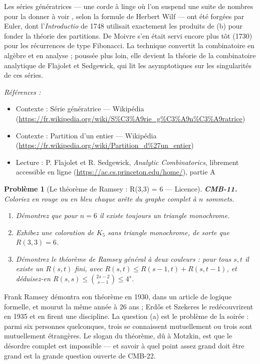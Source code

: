 \documentclass[11pt]{article}
\newtheorem{problem}{Problème}
\newenvironment{refs}{\par\small\noindent\emph{Références :}\begin{itemize}\setlength\itemsep{0pt}}{\end{itemize}\normalsize}
\begin{document}
\noindent Les séries génératrices --- \og{} une corde à linge où l'on suspend une suite de
nombres pour la donner à voir \fg{}, selon la formule de Herbert Wilf --- ont été forgées par Euler, dont
l'\textit{Introductio} de 1748 utilisait exactement les produits de (b) pour fonder la théorie des
partitions. De Moivre s'en était servi encore plus tôt (1730) pour les récurrences de type
Fibonacci. La technique convertit la combinatoire en algèbre et en analyse ; poussée plus loin,
elle devient la théorie de la combinatoire analytique de Flajolet et Sedgewick, qui lit les
asymptotiques sur les singularités de ces séries.

\begin{refs}
\item Contexte : Série génératrice --- Wikipédia (\url{https://fr.wikipedia.org/wiki/S%C3%A9rie_g%C3%A9n%C3%A9ratrice})
\item Contexte : Partition d'un entier --- Wikipédia (\url{https://fr.wikipedia.org/wiki/Partition_d%27un_entier})
\item Lecture : P. Flajolet et R. Sedgewick, \textit{Analytic Combinatorics}, librement accessible en ligne (\url{https://ac.cs.princeton.edu/home/}), partie A
\end{refs}

\bigskip

\begin{problem}[{Le théorème de Ramsey : R(3,3) = 6 --- Licence}]
\textbf{CMB-11.} Coloriez en rouge ou en bleu chaque arête du graphe complet à $ n $
sommets.
\begin{enumerate}
\item[(a)] Démontrez que pour $ n = 6 $ il existe toujours un triangle monochrome.
\item[(b)] Exhibez une coloration de $ K_5 $ sans triangle monochrome, de sorte que
$ R(3,3) = 6 $.
\item[(c)] Démontrez le théorème de Ramsey général à deux couleurs : pour tous $ s, t $ il existe un
$ R(s,t) $ fini, avec $ R(s,t) \le R(s-1,t) + R(s,t-1) $, et déduisez-en
$ R(s,s) \le \binom{2s-2}{s-1} \le 4^s $.
\end{enumerate}

\end{problem}

\noindent Frank Ramsey démontra son théorème en 1930, dans un article de logique
formelle, et mourut la même année à 26 ans ; Erd\H{o}s et Szekeres le redécouvrirent en 1935 et en
firent une discipline. La question (a) est le \og{} problème de la soirée \fg{} : parmi six personnes
quelconques, trois se connaissent mutuellement ou trois sont mutuellement étrangères. Le slogan du
théorème, dû à Motzkin, est que le désordre complet est impossible --- et savoir à quel point
\og{} assez grand \fg{} doit être grand est la grande question ouverte de CMB-22.
\end{document}
